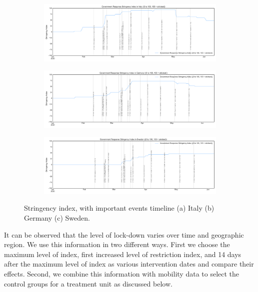 \documentclass[preprint,authoryear,12pt]{elsarticle}
\begin{document}
	\begin{figure}
		\centering
		\begin{subfigure}[b]{\textwidth}
			\centering
			\includegraphics[width=0.9\linewidth,height=0.2\textheight]{GRSI_Italy}
		\end{subfigure}
		
		\begin{subfigure}[b]{\textwidth}
			\centering
			\includegraphics[width=0.9\linewidth,height=0.2\textheight]{GRSI_Germany}
		\end{subfigure}
		
			\begin{subfigure}[b]{\textwidth}
				\centering
			\includegraphics[width=0.9\linewidth,height=0.2\textheight]{GRSI_Sweden}
		\end{subfigure}

			\caption[Stringency index, with important events timeline]{Stringency index, with important events timeline (a) Italy (b) Germany (c) Sweden.}
				\label{fig2} 
	\end{figure}

    It can be observed that the level of lock-down varies over time and geographic region. We use this information in two different ways. First we choose the maximum level of index, first increased level of restriction index, and 14 days after the maximum level of index as various intervention dates and compare their effects. Second, we combine this information with mobility data to select the control groups for a treatment unit as discussed below.
    
\end{document}
